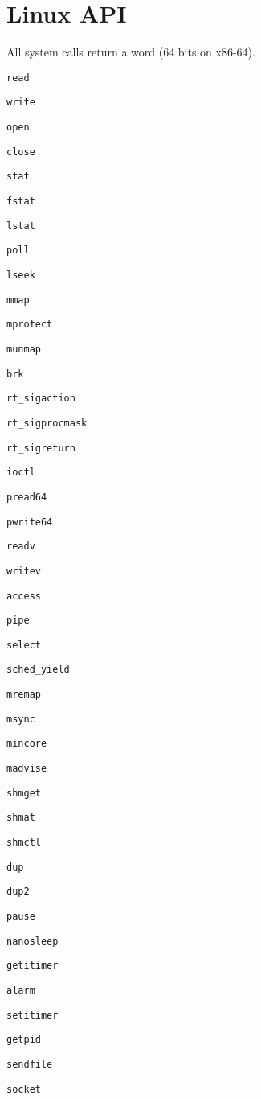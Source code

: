 \chapter{Linux API}

All system calls return a word (64 bits on x86-64).

\verb+read+

\verb+write+

\verb+open+

\verb+close+

\verb+stat+

\verb+fstat+

\verb+lstat+

\verb+poll+

\verb+lseek+

\verb+mmap+

\verb+mprotect+

\verb+munmap+

\verb+brk+

\verb+rt_sigaction+

\verb+rt_sigprocmask+

\verb+rt_sigreturn+

\verb+ioctl+

\verb+pread64+

\verb+pwrite64+

\verb+readv+

\verb+writev+

\verb+access+

\verb+pipe+

\verb+select+

\verb+sched_yield+

\verb+mremap+

\verb+msync+

\verb+mincore+

\verb+madvise+

\verb+shmget+

\verb+shmat+

\verb+shmctl+

\verb+dup+

\verb+dup2+

\verb+pause+

\verb+nanosleep+

\verb+getitimer+

\verb+alarm+

\verb+setitimer+

\verb+getpid+

\verb+sendfile+

\verb+socket+

